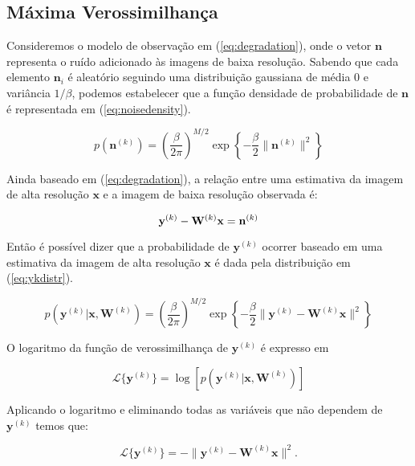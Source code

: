 \subsection{Máxima Verossimilhança}
\label{sec:metodosprob}

Consideremos o modelo de observação em (\ref{eq:degradation}), onde o vetor
$\mathbf{n}$ representa o ruído adicionado às imagens de baixa resolução.
Sabendo que cada elemento $\mathbf{n}_i$ é aleatório seguindo uma distribuição
gaussiana de média 0 e variância $1/\beta$, podemos estabelecer que a função
densidade de probabilidade de $\mathbf{n}$ é representada em (\ref{eq:noisedensity}).

\begin{equation}
	\label{eq:noisedensity}
	p(\mathbf{n}^{(k)}) = \left(\frac{ \beta}{2\pi} \right)^{M/2}
	\exp{\left\{  -  \frac{\beta}{2}\|\mathbf{n}^{(k)}\|^2 \right\}}
\end{equation}

Ainda baseado em (\ref{eq:degradation}), a relação entre uma estimativa da imagem de alta resolução $\mathbf{x}$ e a imagem de baixa resolução observada é:

\begin{equation}
	\mathbf{y}^{(k)} - \mathbf{W}^{(k)} \mathbf{x} =  \mathbf{n}^{(k)} \\
\end{equation}

Então é possível dizer que a probabilidade de $\mathbf{y}^{(k)}$ ocorrer baseado em uma estimativa da imagem de alta resolução $\mathbf{x}$ é dada pela distribuição em (\ref{eq:ykdistr}).

\begin{equation}
	\label{eq:ykdistr}
	p(\mathbf{y}^{(k)} | \mathbf{x}, \mathbf{W}^{(k)}) = \left(\frac{ \beta}{2\pi} \right)^{M/2}
	\exp{\left\{-\frac{\beta}{2}\|\mathbf{y}^{(k)} - \mathbf{W}^{(k)}\mathbf{x} \|^2 \right\}}
\end{equation}

O logaritmo da função de verossimilhança de $\mathbf{y}^{(k)}$ é expresso em

\begin{equation}
	\mathcal{L}\{\mathbf{y}^{(k)}\} = \log \left[ p(\mathbf{y}^{(k)} | \mathbf{x}, \mathbf{W}^{(k)}) \right]
\end{equation}

Aplicando o logaritmo e eliminando todas as variáveis que não dependem de $\mathbf{y}^{(k)}$ temos que:

\begin{equation}
	\mathcal{L}\{\mathbf{y}^{(k)}\} = -\|\mathbf{y}^{(k)} - \mathbf{W}^{(k)}\mathbf{x}\|^2.
\end{equation}

